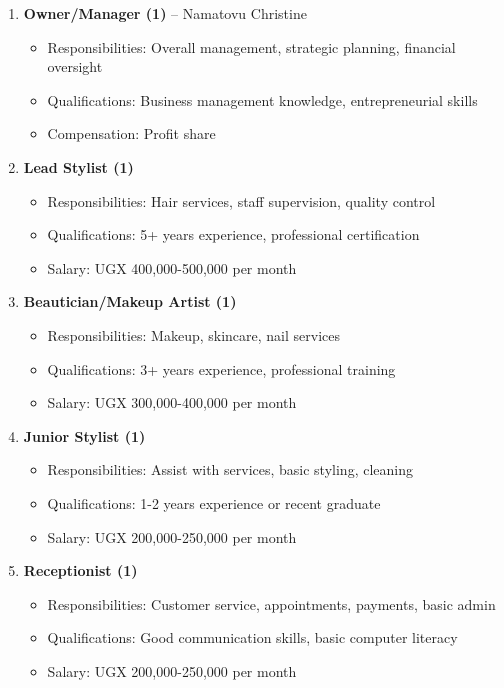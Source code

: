 \documentclass[a4paper,12pt]{article}
\begin{document}
\begin{enumerate}[leftmargin=2em]
    \item \textbf{Owner/Manager (1)} -- Namatovu Christine
    \begin{itemize}
        \item Responsibilities: Overall management, strategic planning, financial oversight
        \item Qualifications: Business management knowledge, entrepreneurial skills
        \item Compensation: Profit share
    \end{itemize}
    
    \item \textbf{Lead Stylist (1)}
    \begin{itemize}
        \item Responsibilities: Hair services, staff supervision, quality control
        \item Qualifications: 5+ years experience, professional certification
        \item Salary: UGX 400,000-500,000 per month
    \end{itemize}
    
    \item \textbf{Beautician/Makeup Artist (1)}
    \begin{itemize}
        \item Responsibilities: Makeup, skincare, nail services
        \item Qualifications: 3+ years experience, professional training
        \item Salary: UGX 300,000-400,000 per month
    \end{itemize}
    
    \item \textbf{Junior Stylist (1)}
    \begin{itemize}
        \item Responsibilities: Assist with services, basic styling, cleaning
        \item Qualifications: 1-2 years experience or recent graduate
        \item Salary: UGX 200,000-250,000 per month
    \end{itemize}
    
    \item \textbf{Receptionist (1)}
    \begin{itemize}
        \item Responsibilities: Customer service, appointments, payments, basic admin
        \item Qualifications: Good communication skills, basic computer literacy
        \item Salary: UGX 200,000-250,000 per month
    \end{itemize}
\end{enumerate}
\end{document}

